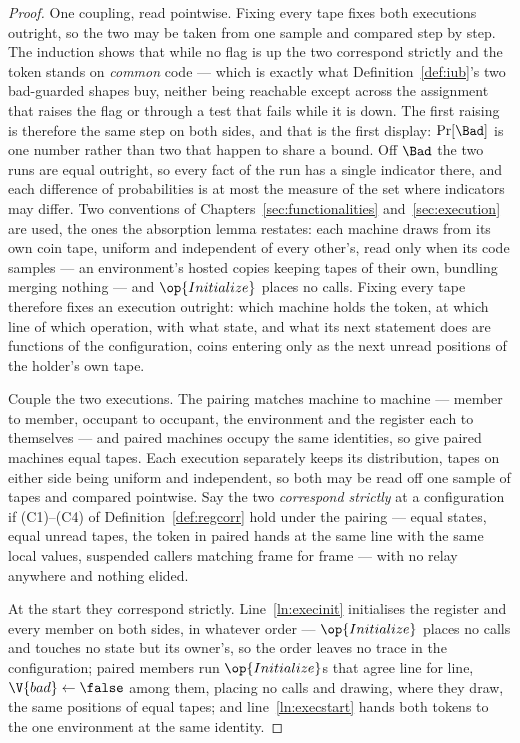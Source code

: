 \documentclass[10pt,oneside,openany]{book}
\theoremstyle{accentdef}
\theoremstyle{accentplain}
\begin{document}
\begin{proof}
One coupling, read pointwise. Fixing every tape fixes both executions outright, so the two may be
taken from one sample and compared step by step. The induction shows that while no flag is up the
two correspond strictly and the token stands on \emph{common} code --- which is exactly what
Definition~\ref{def:iub}'s two bad-guarded shapes buy, neither being reachable except across the
assignment that raises the flag or through a test that fails while it is down. The first raising is
therefore the same step on both sides, and that is the first display: $\Pr[\Bad]$ is one number
rather than two that happen to share a bound. Off $\Bad$ the two runs are equal outright, so every
fact of the run has a single indicator there, and each difference of probabilities is at most the
measure of the set where indicators may differ.
Two conventions of Chapters~\ref{sec:functionalities} and~\ref{sec:execution} are used, the ones
the absorption lemma restates: each machine draws from its own coin tape, uniform and
independent of every other's, read only when its code samples --- an environment's hosted copies
keeping tapes of their own, bundling merging nothing --- and $\op{Initialize}$ places no calls.
Fixing every tape therefore fixes an execution outright: which machine holds the token, at which
line of which operation, with what state, and what its next statement does are functions of the
configuration, coins entering only as the next unread positions of the holder's own tape.

Couple the two executions. The pairing matches machine to machine --- member to member, occupant
to occupant, the environment and the register each to themselves --- and paired machines occupy
the same identities, so give paired machines equal tapes. Each execution separately keeps its
distribution, tapes on either side being uniform and independent, so both may be read off one
sample of tapes and compared pointwise. Say the two \emph{correspond strictly} at a
configuration if (C1)--(C4) of Definition~\ref{def:regcorr} hold under the pairing --- equal
states, equal unread tapes, the token in paired hands at the same line with the same local
values, suspended callers matching frame for frame --- with no relay anywhere and nothing
elided.

At the start they correspond strictly. Line~\ref{ln:execinit} initialises the register and every
member on both sides, in whatever order --- $\op{Initialize}$ places no calls and touches no
state but its owner's, so the order leaves no trace in the configuration; paired members run
$\op{Initialize}$s that agree line for line,
$\V{bad} \gets \false$ among them, placing no calls and drawing, where they draw, the same
positions of equal tapes; and line~\ref{ln:execstart} hands both tokens to the one environment
at the same identity.


\end{proof}
\end{document}
